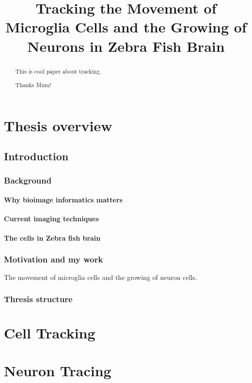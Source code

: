 \documentclass[b5,12pt]{report}
\title{Tracking the Movement of Microglia Cells and the Growing of Neurons in Zebra Fish Brain}
\begin{document}
\maketitle
\begin{abstract}
 This is cool paper about tracking.
\end{abstract}
\renewcommand{\abstractname}{Acknowledgements}
\begin{abstract}
 Thanks Mum!
\end{abstract}

\tableofcontents
\listoffigures
\part{Thesis overview}
\chapter{Introduction}
\section{Background}
\subsection{Why bioimage informatics matters}
\subsection{Current imaging techniques}
\subsection{The cells in Zebra fish brain}
\section{Motivation and my work}
The movement of microglia cells and the growing of neuron cells.
\section{Thresis structure}
\part{Cell Tracking}
\part{Neuron Tracing}





\end{document}
